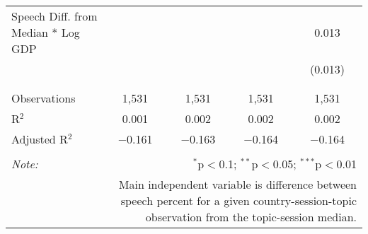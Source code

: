 \begin{table}[!htbp]
\begin{tabular}{@{\extracolsep{5pt}}lcccc}
 Speech Diff. from Median * Log GDP &  &  &  & 0.013 \\ 
  &  &  &  & (0.013) \\ 
  & & & & \\ 
\hline \\[-1.8ex] 
Observations & 1,531 & 1,531 & 1,531 & 1,531 \\ 
R$^{2}$ & 0.001 & 0.002 & 0.002 & 0.002 \\ 
Adjusted R$^{2}$ & $-$0.161 & $-$0.163 & $-$0.164 & $-$0.164 \\ 
\hline 
\hline \\[-1.8ex] 
\textit{Note:}  & \multicolumn{4}{r}{$^{*}$p$<$0.1; $^{**}$p$<$0.05; $^{***}$p$<$0.01} \\ 
 & \multicolumn{4}{r}{Main independent variable is difference between speech percent for a given country-session-topic observation from the topic-session median.} \\ 
\end{tabular} 
\end{table} 
